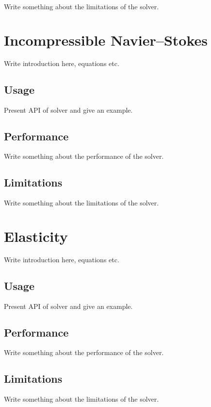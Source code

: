 Write something about the limitations of the solver.

\section{Incompressible Navier--Stokes}

Write introduction here, equations etc.

\subsection{Usage}

Present API of solver and give an example.

\subsection{Performance}

Write something about the performance of the solver.

\subsection{Limitations}

Write something about the limitations of the solver.

\section{Elasticity}

Write introduction here, equations etc.

\subsection{Usage}

Present API of solver and give an example.

\subsection{Performance}

Write something about the performance of the solver.

\subsection{Limitations}

Write something about the limitations of the solver.
